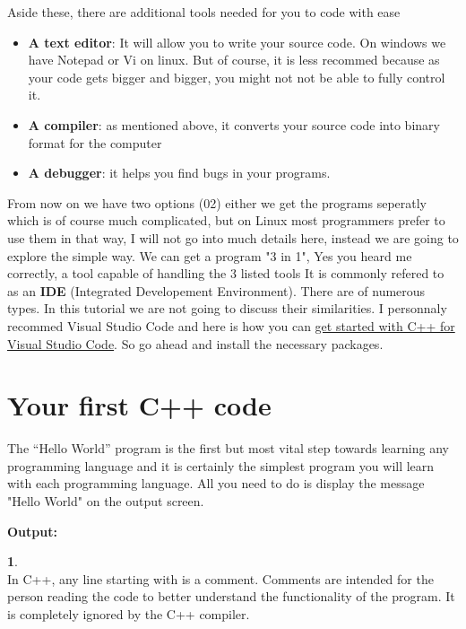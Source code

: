 \documentclass[11pt, a4paper]{article}
\begin{document}
Aside these, there are additional tools needed for you to code with ease
\begin{itemize}
    \item \textbf{A text editor}: It will allow you to write your source
    code. On windows we have Notepad or Vi on linux. But of course, it is
    less recommed because as your code gets bigger and bigger, you might not 
    not be  able to fully control it.
    \item \textbf{A compiler}: as mentioned above, it converts your source code into
    binary format for the computer
    \item \textbf{A debugger}: it helps you find bugs in your programs.
\end{itemize}
From now on we have two options (02) either we get the programs seperatly
which is of course much complicated, but on Linux most programmers prefer
to use them in that way, I will not go into much details here, instead we
are going to explore the simple way. We can get a program "3 in 1",
Yes you heard me correctly, a tool capable of handling the 3 listed tools
It is commonly refered to as an \textbf{IDE} (Integrated Developement Environment).
There are of numerous types. In this tutorial we are not going to discuss
their similarities. I personnaly recommed Visual Studio Code and here is
how you can \href{https://code.visualstudio.com/docs/languages/cpp}
{get started with C++ for Visual Studio Code}. So go ahead and install the
necessary packages.

\section{Your first C++ code}
The “Hello World” program is the first but most vital step towards
learning any programming language and it is certainly the simplest
program you will learn with each programming language. All you need
to do is display the message "Hello World" on the output screen.


\noindent \textbf{Output:}


\noindent
\textbf{1}. \\
In C++, any line starting with \fbox{\color{green!60!black}//} is a comment. Comments are
intended for the person reading the code to better understand the
functionality of the program. It is completely ignored by the C++
compiler.
\end{document}
